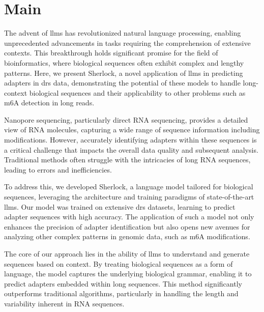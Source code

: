 \documentclass[pdflatex, sn-mathphys-num, lineno]{sn-jnl}%
\newcommand{\chopper}{Sherlock}
\theoremstyle{thmstyleone}%
\theoremstyle{thmstyletwo}%
\theoremstyle{thmstylethree}%
\begin{document}
\maketitle

\section{Main}\label{sec1}


The advent of \glspl{llm} has revolutionized natural language processing, enabling unprecedented advancements in tasks requiring the comprehension of extensive contexts.
This breakthrough holds significant promise for the field of bioinformatics, where biological sequences often exhibit complex and lengthy patterns.
Here, we present \chopper, a novel application of \glspl{llm} in predicting adapters in \gls{drs} data, demonstrating the potential of these models to handle long-context biological sequences and their applicability to other problems such as m6A detection in long reads.

Nanopore sequencing, particularly direct RNA sequencing, provides a detailed view of RNA molecules, capturing a wide range of sequence information including modifications.
However, accurately identifying adapters within these sequences is a critical challenge that impacts the overall data quality and subsequent analysis.
Traditional methods often struggle with the intricacies of long RNA sequences, leading to errors and inefficiencies.

To address this, we developed \chopper, a language model tailored for biological sequences, leveraging the architecture and training paradigms of state-of-the-art \glspl{llm}.
Our model was trained on extensive \gls{drs} datasets, learning to predict adapter sequences with high accuracy.
The application of such a model not only enhances the precision of adapter identification but also opens new avenues for analyzing other complex patterns in genomic data, such as m6A modifications.

The core of our approach lies in the ability of \glspl{llm} to understand and generate sequences based on context.
By treating biological sequences as a form of language, the model captures the underlying biological grammar, enabling it to predict adapters embedded within long sequences.
This method significantly outperforms traditional algorithms, particularly in handling the length and variability inherent in RNA sequences.
\end{document}

